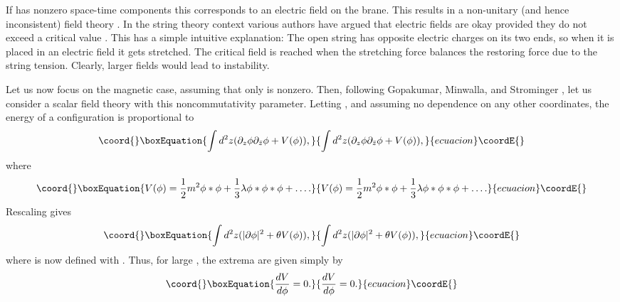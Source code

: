 \documentclass[a4paper,12pt]{article}
\begin{document}
If \myHighlight{$\theta^{\mu\nu}$}\coordHE{} has nonzero space-time components this
corresponds to an electric field on the brane.  This results in a
non-unitary (and hence inconsistent) field theory \cite{GM}.  In the string
theory context various authors have argued that electric fields
are okay provided they do not exceed a critical value \coordHE{}.
This has a simple intuitive explanation: The open string has
opposite electric charges on its two ends, so when it is placed in
an electric field it gets stretched. The critical field is reached
when the stretching force balances the restoring force due to the
string tension.  Clearly, larger fields would lead to instability.

Let us now focus on the magnetic case, assuming that only
\coordHE{} is nonzero.  Then, following Gopakumar,
Minwalla, and Strominger \cite{GMS}, let us consider a scalar field theory
with this noncommutativity parameter. Letting \coordHE{},
and assuming no dependence on any other coordinates, the energy of
a configuration is proportional to
\begin{equation}\coord{}\boxEquation{
\int d^2 z (\partial_z \phi \partial_{\bar z} \phi + V(\phi)),
}{
\int d^2 z (\partial_z \phi \partial_{\bar z} \phi + V(\phi)),
}{ecuacion}\coordE{}\end{equation}
where
\begin{equation}\coord{}\boxEquation{
V (\phi) = \frac{1}{2} m^2 \phi * \phi + \frac{1}{3} \lambda \phi * \phi * \phi
+ \ldots.
}{
V (\phi) = \frac{1}{2} m^2 \phi * \phi + \frac{1}{3} \lambda \phi * \phi * \phi
+ \ldots.
}{ecuacion}\coordE{}\end{equation}
Rescaling \coordHE{} gives
\begin{equation}\coord{}\boxEquation{
 \int d^2 z (|\partial \phi|^2 + \theta V (\phi)),
}{
 \int d^2 z (|\partial \phi|^2 + \theta V (\phi)),
}{ecuacion}\coordE{}\end{equation}
where \myHighlight{$*$}\coordHE{} is now defined with \coordHE{}.  Thus, for large
\myHighlight{$\theta$}\coordHE{}, the extrema are given simply by
\begin{equation}\coord{}\boxEquation{
\frac{dV}{d\phi} = 0.
}{
\frac{dV}{d\phi} = 0.
}{ecuacion}\coordE{}\end{equation}
\end{document}
